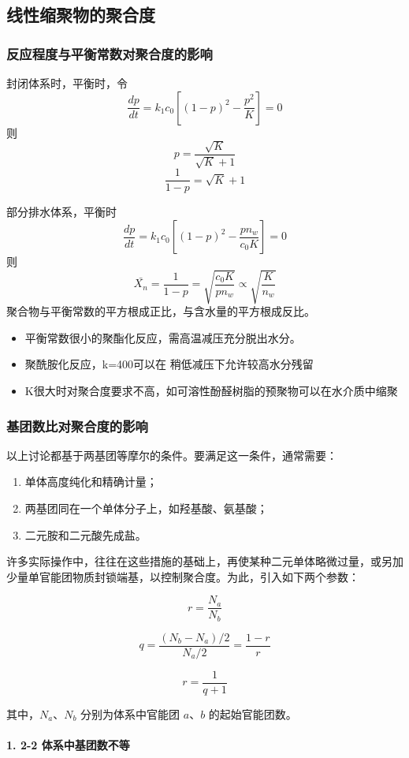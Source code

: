 ﻿\documentclass[12pt,a4paper]{article}
\begin{document}
\subsection{线性缩聚物的聚合度}
\subsubsection{反应程度与平衡常数对聚合度的影响}
封闭体系时，平衡时，令$$\frac{dp}{dt}=k_1c_0[(1-p)^2-\frac{p^2}{K}]=0$$
则$$p=\frac{\sqrt{K}}{\sqrt{K}+1}$$
$$\frac{1}{1-p}=\sqrt{K}+1$$

部分排水体系，平衡时$$\frac{dp}{dt}=k_1c_0[(1-p)^2-\frac{pn_w}{c_0K}]=0$$
则$$\bar{X_n}=\frac{1}{1-p}=\sqrt{\frac{c_0K}{pn_w}}\varpropto \sqrt{\frac{K}{n_w}}$$
聚合物与平衡常数的平方根成正比，与含水量的平方根成反比。
\begin{itemize}
  \item 平衡常数很小的聚酯化反应，需高温减压充分脱出水分。
  \item 聚酰胺化反应，k=400可以在 稍低减压下允许较高水分残留
  \item K很大时对聚合度要求不高，如可溶性酚醛树脂的预聚物可以在水介质中缩聚
\end{itemize}
\subsubsection{基团数比对聚合度的影响}

以上讨论都基于两基团等摩尔的条件。要满足这一条件，通常需要：
\begin{enumerate}[1)]
    \item 单体高度纯化和精确计量；
    \item 两基团同在一个单体分子上，如羟基酸、氨基酸；
    \item 二元胺和二元酸先成盐。
\end{enumerate}

许多实际操作中，往往在这些措施的基础上，再使某种二元单体略微过量，或另加少量单官能团物质封锁端基，以控制聚合度。为此，引入如下两个参数：

\[
r=\frac{N_a}{N_b}
\]

\[
q=\frac{(N_b-N_a)/2}{N_a/2}=\frac{1-r}{r}
\]

\[
r=\frac{1}{q+1}
\]

其中，$N_a$、$N_b$ 分别为体系中官能团 $a$、$b$ 的起始官能团数。

\paragraph{1. 2-2 体系中基团数不等}
\end{document}
